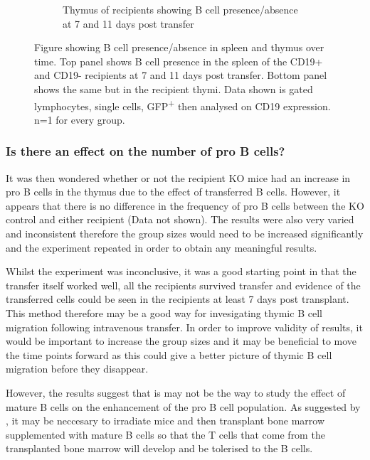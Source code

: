 \begin{figure}
\begin{subfigure}{\textwidth}
	\caption{Thymus of recipients showing B cell presence/absence at 7 and 11 days post transfer}
	\end{subfigure}
\caption{Figure showing B cell presence/absence in spleen and thymus over time.
Top panel shows B cell presence in the spleen of the CD19+ and CD19- recipients at 7 and 11 days post transfer.
Bottom panel shows the same but in the recipient thymi.
Data shown is gated lymphocytes, single cells, GFP\textsuperscript{+} then analysed on CD19 expression.
n=1 for every group.}
\label{fig:Transfer}
\end{figure}

\subsubsection{Is there an effect on the number of pro B cells?}

It was then wondered whether or not the recipient KO mice had an increase in pro B cells in the thymus due to the effect of transferred B cells.
However, it appears that there is no difference in the frequency of pro B cells between the KO control and either recipient (Data not shown).
The results were also very varied and inconsistent therefore the group sizes would need to be increased significantly and the experiment repeated in order to obtain any meaningful results.

Whilst the experiment was inconclusive, it was a good starting point in that the transfer itself worked well, all the recipients survived transfer and evidence of the transferred cells could be seen in the recipients at least 7 days post transplant.
This method therefore may be a good way for invesigating thymic B cell migration following intravenous transfer.
In order to improve validity of results, it would be important to increase the group sizes and it may be beneficial to move the time points forward as this could give a better picture of thymic B cell migration before they disappear.

However, the results suggest that is may not be the way to study the effect of mature B cells on the enhancement of the pro B cell population.
As suggested by \citet{Serreze1998}, it may be neccesary to irradiate mice and then transplant bone marrow supplemented with mature B cells so that the T cells that come from the transplanted bone marrow will develop and be tolerised to the B cells.

